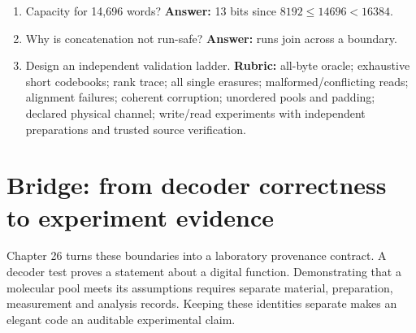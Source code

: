 \begin{enumerate}
branch's completion interval.
\item Capacity for 14,696 words? \textbf{Answer:} 13 bits since
$8192\leq14696<16384$.
\item Why is concatenation not run-safe? \textbf{Answer:} runs join across a boundary.
\item Design an independent validation ladder. \textbf{Rubric:}
all-byte oracle; exhaustive short codebooks; rank trace; all single erasures;
malformed/conflicting reads; alignment failures; coherent corruption;
unordered pools and padding; declared physical channel; write/read
experiments with independent preparations and trusted source verification.
\end{enumerate}

\section{Bridge: from decoder correctness to experiment evidence}
Chapter 26 turns these boundaries into a laboratory provenance contract.
A decoder test proves a statement about a digital function. Demonstrating
that a molecular pool meets its assumptions requires separate material,
preparation, measurement and analysis records. Keeping these identities
separate makes an elegant code an auditable experimental claim.
